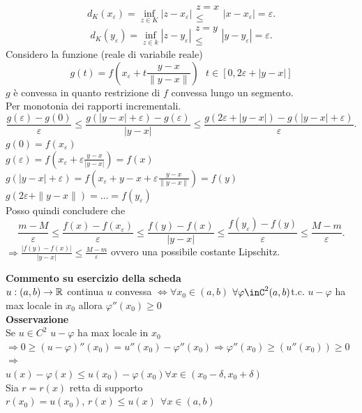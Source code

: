 \documentclass[12px]{article}
\begin{document}
\begin{dimo}
   \[
	   d_K(x_\varepsilon) = \inf_{z\in K}|z-x_\varepsilon|\substack{z=x\\\leq }|x- x_\varepsilon| = \varepsilon
  .\] 
  \[
	  d_K(y_\varepsilon) = \inf_{z\in k}|z-y_\varepsilon|\substack{z=y\\\leq}|y-y_\varepsilon|=\varepsilon
  .\] 
  Considero la funzione (reale di variabile reale) \[g(t) = f \left(x_\varepsilon + t\frac{y-x}{\|y-x\|} \right) \ \ \ t\in [0,2\varepsilon + |y-x|]\]
  $g$ è convessa in quanto restrizione di $f$ convessa lungo un segmento.\\
  Per monotonia dei rapporti incrementali.
  \[
	  \frac{g(\varepsilon)- g(0)}{\varepsilon}\leq \frac{g(|y - x| + \varepsilon) - g(\varepsilon)}{|y-x|}\leq \frac{g(2\varepsilon + |y-x|)- g(|y-x|+\varepsilon)}{\varepsilon}
  .\] 
  $g(0) = f(x_\varepsilon)$\\
  $g(\varepsilon) = f(x_\varepsilon + \varepsilon \frac{y-x}{|y-x|}) = f(x)$\\
  $g(|y-x| + \varepsilon) = f \left(x_\varepsilon + y - x + \varepsilon \frac{y-x}{\|y-x\|} \right) = f(y)$\\
  $g(2\varepsilon + \|y-x\|) = \ldots = f(y_\varepsilon)$ \\
  Posso quindi concludere che 
  \[
	  \frac{m-M}\varepsilon\leq \frac{f(x) - f(x_\varepsilon)}{\varepsilon}\leq \frac{f(y) - f(x)}{|y-x|}\leq \frac{f(y_\varepsilon)- f(y)}{\varepsilon}\leq \frac{M-m}\varepsilon
  .\] 
  $\displaystyle \Rightarrow  \frac{|f(y) - f(x)|}{|y-x|}\leq \frac{M-m}\varepsilon$ ovvero una possibile costante Lipschitz.
	 \end{dimo}
	 \textbf{Commento su esercizio della scheda}\\
	 $u:(a,b) \rightarrow \mathbb{R}$ continua
	 $u$ convessa $ \Leftrightarrow \forall x_0\in (a,b)$ $\forall \varphi\inC^2(a,b)$t.c.  $u- \varphi$ ha max locale in $x_0$ allora $ \varphi''(x_0)\geq 0$  \\
	 \textbf{Osservazione}\\
	 Se $u\in C^2$  $u- \varphi$ ha max locale in $x_0$\\
	 $ \Rightarrow 0 \geq (u- \varphi)''(x_0) = u''(x_0) - \varphi''(x_0) \Rightarrow \varphi''(x_0)\geq (u''(x_0))\geq 0 $ \\
	 $ \Rightarrow  $ \\
	 $u(x) - \varphi(x)\leq u(x_0)- \varphi(x_0)\forall x\in (x_0-\delta, x_0 + \delta)$\\
	 Sia $r = r(x)$ retta di supporto\\
	  $r(x_0) = u(x_0)$, $r(x)\leq u(x)\ \ \forall x\in (a,b)$\\
\end{document}
